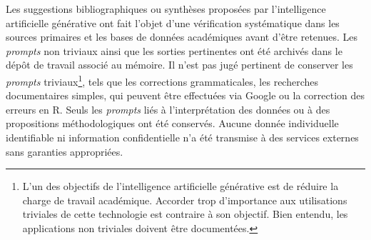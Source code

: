 Les suggestions bibliographiques ou synthèses proposées par l'intelligence artificielle générative ont fait l'objet d'une vérification systématique dans les sources primaires et les bases de données académiques avant d'être retenues. Les \emph{prompts} non triviaux ainsi que les sorties pertinentes ont été archivés dans le dépôt de travail associé au mémoire. Il n'est pas jugé pertinent de conserver les \emph{prompts} triviaux\footnote{L'un des objectifs de l'intelligence artificielle générative est de réduire la charge de travail académique. Accorder trop d'importance aux utilisations triviales de cette technologie est contraire à son objectif. Bien entendu, les applications non triviales doivent être documentées.}, tels que les corrections grammaticales, les recherches documentaires simples, qui peuvent être effectuées via Google ou la correction des erreurs en R. Seuls les \emph{prompts} liés à l'interprétation des données ou à des propositions méthodologiques ont été conservés. Aucune donnée individuelle identifiable ni information confidentielle n’a été transmise à des services externes sans garanties appropriées.


